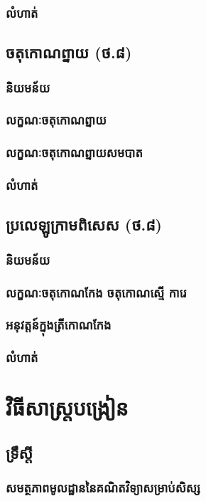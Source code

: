 \documentclass[a4paper,12pt,blue]{pptec}
\begin{document}
	\section{លំហាត់}
	\chapter{ចតុកោណព្នាយ (ថ.៨)}
	\section{និយមន័យ}
	\section{លក្ខណៈចតុកោណព្នាយ}
	\section{លក្ខណៈចតុកោណព្នាយសមបាត}
	\section{លំហាត់}
	\chapter{ប្រលេឡូក្រាមពិសេស (ថ.៨)}
	\section{និយមន័យ}
	\section{លក្ខណៈចតុកោណកែង ចតុកោណស្មើ ការេ}
	\section{អនុវត្តន៍ក្នុងត្រីកោណកែង}
	\section{លំហាត់}
	\part{វិធីសាស្ត្របង្រៀន}
	\chapter{ទ្រឹស្ដី}
	\section{សមត្ថភាពមូលដ្ឋាននៃគណិតវិទ្យាសម្រាប់សិស្ស}
\end{document}
